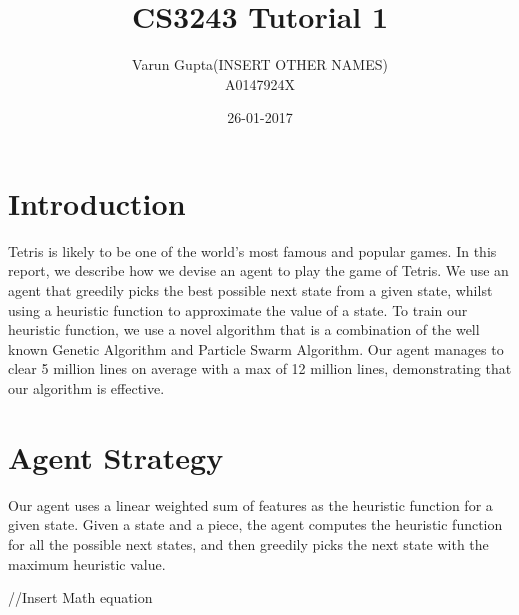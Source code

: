 \documentclass{article}
\title{CS3243 Tutorial 1}
\author{Varun Gupta(INSERT OTHER NAMES)\\A0147924X}
\date{26-01-2017}
\begin{document}
	\maketitle
	\thispagestyle{empty}
	\vspace{5mm}

    \section{Introduction}
    Tetris is likely to be one of the world's most famous and popular games.
    In this report, we describe how we devise an agent to play the game of Tetris.
    We use an agent that greedily picks the best possible next state from a given state,
    whilst using a heuristic function to approximate the value of a state. To train our heuristic
    function, we use a novel algorithm that is a combination of the well known Genetic Algorithm
    and Particle Swarm Algorithm. Our agent manages to clear 5 million lines on average with a max
    of 12 million lines, demonstrating that our algorithm is effective.

    \section{Agent Strategy}
    Our agent uses a linear weighted sum of features as the heuristic function for a given state. Given a state and a piece, the agent computes
    the heuristic function for all the possible next states, and then greedily picks the next state with
    the maximum heuristic value.

    //Insert Math equation
\end{document}
